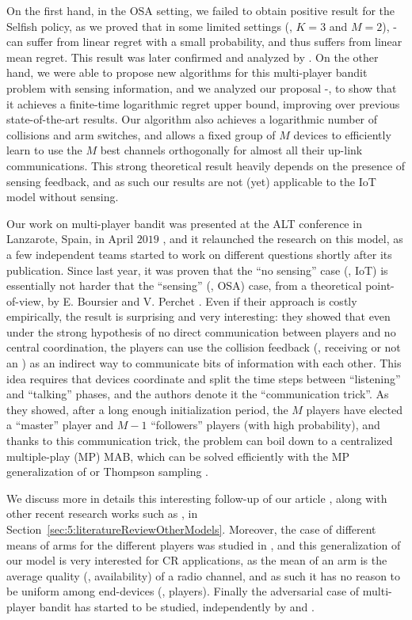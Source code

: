 On the first hand, in the OSA setting, we failed to obtain positive result for the Selfish policy, as we proved that in some limited settings (\eg, $K=3$ and $M=2$), \Selfish-\UCB{} can suffer from linear regret with a small probability, and thus suffers from linear mean regret.
This result was later confirmed and analyzed by \cite{BoursierPerchet18}.
%
On the other hand, we were able to propose new algorithms for this multi-player bandit problem with sensing information, and we analyzed our proposal \MCTopM-\klUCB, to show that it achieves a finite-time logarithmic regret upper bound, improving over previous state-of-the-art results.
Our algorithm also achieves a logarithmic number of collisions and arm switches, and allows a fixed group of $M$ devices to efficiently learn to use the $M$ best channels orthogonally for almost all their up-link communications.
%
This strong theoretical result heavily depends on the presence of sensing feedback, and as such our results are not (yet) applicable to the IoT model without sensing.

Our work on multi-player bandit was presented at the ALT conference in Lanzarote, Spain, in April $2019$ \cite{Besson2018ALT},
%
and it relaunched the research on this model, as a few independent teams started to work on different questions shortly after its publication.
%
Since last year, it was proven that the ``no sensing'' case (\ie, IoT) is essentially not harder that the ``sensing'' (\ie, OSA) case, from a theoretical point-of-view, by E. Boursier and V. Perchet \cite{BoursierPerchet18}.
Even if their approach is costly empirically, the result is surprising and very interesting: they showed that even under the strong hypothesis of no direct communication between players and no central coordination, the players can use the collision feedback (\ie, receiving or not an \Ack) as an indirect way to communicate bits of information with each other.
This idea requires that devices coordinate and split the time steps between ``listening'' and ``talking'' phases, and the authors denote it the ``communication trick''. As they showed, after a long enough initialization period, the $M$ players have elected a ``master'' player and $M-1$ ``followers'' players (with high probability), and thanks to this communication trick, the problem can boil down to a centralized multiple-play (MP) MAB, which can be solved efficiently with the MP generalization of \klUCB{} \cite{Luedtke16} or Thompson sampling \cite{Komiyama15}.

We discuss more in details this interesting follow-up of our article \cite{BoursierPerchet18}, along with other recent research works such as \cite{LugosiMehrabian18}, in Section~\ref{sec:5:literatureReviewOtherModels}.
%
Moreover, the case of different means of arms for the different players was studied in \cite{Bistritz18,KaufmannAbbas19}, and this generalization of our model is very interested for CR applications, as the mean of an arm is the average quality (\eg, availability) of a radio channel, and as such it has no reason to be uniform among end-devices (\ie, players).
%
Finally the adversarial case of multi-player bandit has started to be studied, independently by \cite{bande2019adversarial} and \cite{AlaturLevyKrause19}.


